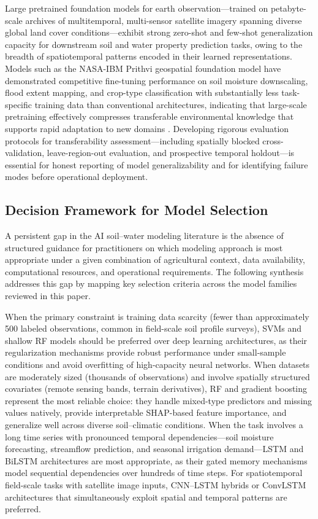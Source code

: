 \documentclass[land,review,accept,pdftex,oneauthor]{Definitions/mdpi}
\begin{document}
Large pretrained foundation models for earth observation---trained on petabyte-scale archives of multitemporal, multi-sensor satellite imagery spanning diverse global land cover conditions---exhibit strong zero-shot and few-shot generalization capacity for downstream soil and water property prediction tasks, owing to the breadth of spatiotemporal patterns encoded in their learned representations. Models such as the NASA-IBM Prithvi geospatial foundation model have demonstrated competitive fine-tuning performance on soil moisture downscaling, flood extent mapping, and crop-type classification with substantially less task-specific training data than conventional architectures, indicating that large-scale pretraining effectively compresses transferable environmental knowledge that supports rapid adaptation to new domains \citep{jakubik2023foundation}. Developing rigorous evaluation protocols for transferability assessment---including spatially blocked cross-validation, leave-region-out evaluation, and prospective temporal holdout---is essential for honest reporting of model generalizability and for identifying failure modes before operational deployment.


\subsection{{Decision Framework for Model Selection}}

{A persistent gap in the AI soil--water modeling literature is the absence of structured guidance for practitioners on which modeling approach is most appropriate under a given combination of agricultural context, data availability, computational resources, and operational requirements. The following synthesis addresses this gap by mapping key selection criteria across the model families reviewed in this paper.}

{When the primary constraint is training data scarcity (fewer than approximately 500 labeled observations, common in field-scale soil profile surveys), SVMs and shallow RF models should be preferred over deep learning architectures, as their regularization mechanisms provide robust performance under small-sample conditions and avoid overfitting of high-capacity neural networks. When datasets are moderately sized (thousands of observations) and involve spatially structured covariates (remote sensing bands, terrain derivatives), RF and gradient boosting represent the most reliable choice: they handle mixed-type predictors and missing values natively, provide interpretable SHAP-based feature importance, and generalize well across diverse soil--climatic conditions. When the task involves a long time series with pronounced temporal dependencies---soil moisture forecasting, streamflow prediction, and seasonal irrigation demand---LSTM and BiLSTM architectures are most appropriate, as their gated memory mechanisms model sequential dependencies over hundreds of time steps. For spatiotemporal field-scale tasks with satellite image inputs, CNN--LSTM hybrids or ConvLSTM architectures that simultaneously exploit spatial and temporal patterns are preferred.} 
\end{document}
